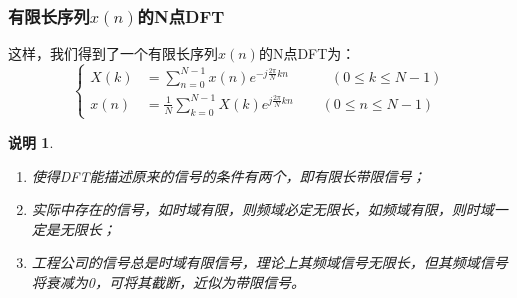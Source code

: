 \documentclass[notheorems,compress,mathserif,table]{beamer}
\newtheorem{definition}{定义}
\newtheorem{shuoming}{说明}
\begin{document}
\begin{frame}[shrink]\frametitle{有限长序列$x(n)$的N点DFT}%
    这样，我们得到了一个有限长序列$x(n)$的N点DFT为：
    \begin{equation*}
           \left\{ \begin{aligned}
               X(k) &=  \sum_{n=0}^{N-1}x(n)e^{-j\frac{2\pi}{N}kn}  \quad\quad\quad (0 \leq k \leq N-1) \\
               x(n) &=   \frac{1}{N}\sum_{k=0}^{N-1}X(k)e^{j\frac{2\pi}{N}kn} \quad\quad (0 \leq n \leq N-1)
           \end{aligned} \right.
    \end{equation*}
\begin{shuoming}
    \begin{enumerate}
      \item 使得DFT能描述原来的信号的条件有两个，即有限长带限信号；
      \item 实际中存在的信号，如时域有限，则频域必定无限长，如频域有限，则时域一定是无限长；
      \item 工程公司的信号总是时域有限信号，理论上其频域信号无限长，但其频域信号将衰减为0，可将其截断，近似为带限信号。
    \end{enumerate}
\end{shuoming}
\end{frame}
%
%
%
%
%
%
%
%
\end{document}
